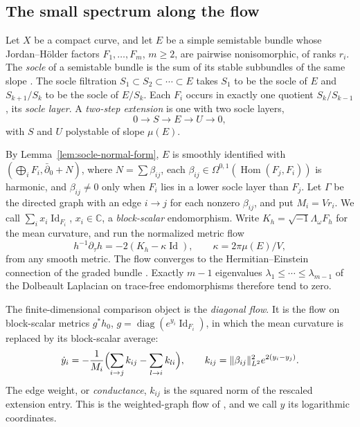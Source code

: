 \documentclass[11pt]{amsart}
\theoremstyle{definition}
\theoremstyle{remark}
\newcommand{\CC}{\mathbb C}
\newcommand{\id}{\operatorname{Id}}
\newcommand{\db}{\bar\partial}
\newcommand{\Hom}{\operatorname{Hom}}
\newcommand{\diag}{\operatorname{diag}}
\begin{document}
\subsection{The small spectrum along the flow}\label{sec:intro-flow}

Let $X$ be a compact curve, and let $E$ be a simple semistable bundle whose
Jordan--H\"older factors $F_1,\ldots,F_m$, $m\ge2$, are pairwise
nonisomorphic, of ranks $r_i$. The \emph{socle} of a semistable bundle is
the sum of its stable subbundles of the same slope
\cite[Section~1.5]{HuybrechtsLehn2010}. The socle filtration
$S_1\subset S_2\subset\cdots\subset E$ takes $S_1$ to be the socle of $E$
and $S_{k+1}/S_k$ to be the socle of $E/S_k$. Each $F_i$ occurs in exactly
one quotient $S_k/S_{k-1}$, its \emph{socle layer}. A \emph{two-step
extension} is one with two socle layers,
\[
 0\longrightarrow S\longrightarrow E\longrightarrow U\longrightarrow0,
\]
with $S$ and $U$ polystable of slope $\mu(E)$.

By Lemma~\ref{lem:socle-normal-form}, $E$ is smoothly identified with
$(\bigoplus_iF_i,\db_0+N)$, where $N=\sum\beta_{ij}$, each
$\beta_{ij}\in\Omega^{0,1}(\Hom(F_j,F_i))$ is harmonic, and $\beta_{ij}\ne0$
only when $F_i$ lies in a lower socle layer than $F_j$. Let $\Gamma$ be the
directed graph with an edge $i\to j$ for each nonzero $\beta_{ij}$, and put
$M_i=Vr_i$. We call $\sum_ix_i\id_{F_i}$, $x_i\in\CC$, a
\emph{block-scalar} endomorphism. Write $K_h=\sqrt{-1}\Lambda_\omega F_h$
for the mean curvature, and run the normalized metric flow
\[
 h^{-1}\partial_\tau h=-2(K_h-\kappa\id),\qquad \kappa=2\pi\mu(E)/V,
\]
from any smooth metric. The flow converges to the Hermitian--Einstein
connection of the graded bundle \cite{Daskalopoulos1992,Rade1992}. Exactly
$m-1$ eigenvalues $\lambda_1\le\cdots\le\lambda_{m-1}$ of the Dolbeault
Laplacian on trace-free endomorphisms therefore tend to zero.

The finite-dimensional comparison object is the \emph{diagonal flow}. It is
the flow on block-scalar metrics $g^*h_0$, $g=\diag(e^{y_i}\id_{F_i})$, in
which the mean curvature is replaced by its block-scalar average:
\begin{equation}\label{eq:intro-diag-flow}
 \dot y_i=-\frac1{M_i}\Bigl(\sum_{i\to j}k_{ij}-\sum_{l\to i}k_{li}\Bigr),
 \qquad k_{ij}=\lVert\beta_{ij}\rVert_{L^2}^2e^{2(y_i-y_j)}.
\end{equation}
The edge weight, or \emph{conductance}, $k_{ij}$ is the squared norm of the
rescaled extension entry. This is the weighted-graph flow of
\cite[(3.10)]{HKKP2023}, and we call $y$ its logarithmic coordinates.
\end{document}
